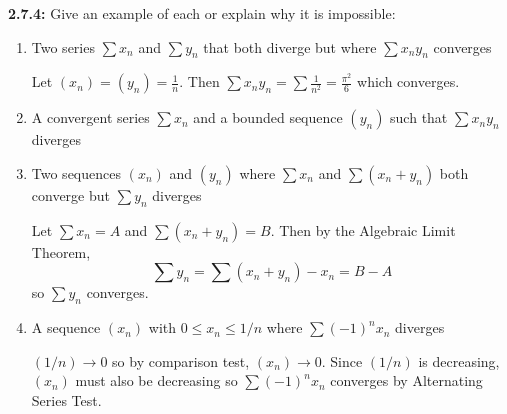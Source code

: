 \documentclass[12pt]{article}
\begin{document}
\textbf{2.7.4:} Give an example of each or explain why it is impossible:
\begin{enumerate}
    \item Two series $\sum x_n$ and $\sum y_n$ that both diverge but where $\sum x_n y_n$ converges 
    
        \color{blue}
            Let $(x_n) = (y_n) = \frac{1}{n}$. Then $\sum x_n y_n = \sum \frac{1}{n^2} = \frac{\pi^2}{6}$ which converges.
        \color{black}

        \color{red}
    \item A convergent series $\sum x_n$ and a bounded sequence $(y_n)$ such that $\sum x_n y_n$ diverges
    
        \color{blue}
        \color{black}

    \item Two sequences $(x_n)$ and $(y_n)$ where $\sum x_n$ and $\sum(x_n + y_n)$ both converge but $\sum y_n$ diverges
    
        \color{blue}
            Let $\sum x_n = A$ and $\sum (x_n + y_n) = B$. Then by the Algebraic Limit Theorem,
            \[\sum y_n = \sum (x_n + y_n) - x_n = B - A \]
            so $\sum y_n$ converges. 
        \color{black}

    \item A sequence $(x_n)$ with $0 \leq x_n \leq 1/n$ where $\sum (-1)^n x_n$ diverges
    
        \color{blue}
            $(1/n) \to 0$ so by comparison test, $(x_n) \to 0$. Since $(1/n)$ is decreasing, $(x_n)$ must also be decreasing so $\sum (-1)^n x_n$ converges by Alternating Series Test. 
        \color{black}

\end{enumerate}
\end{document}

